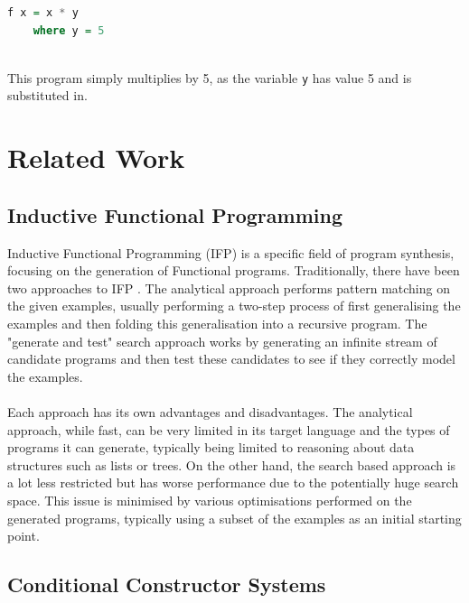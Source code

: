 \begin{lstlisting}[language = Haskell]
f x = x * y
	where y = 5
\end{lstlisting}
\mbox{}\\
This program simply multiplies by 5, as the variable \lstinline!y! has value 5 and is substituted in.

\section{Related Work}

\subsection{Inductive Functional Programming}

Inductive Functional Programming (IFP) \cite{IFPnotes} is a specific field of program synthesis, focusing on the generation of Functional programs. Traditionally, there have been two approaches to IFP \cite{Katayama2012}. The analytical approach performs pattern matching on the given examples, usually performing a two-step process of first generalising the examples and then folding this generalisation into a recursive program. The "generate and test" search approach works by generating an infinite stream of candidate programs and then test these candidates to see if they correctly model the examples. \\ \\
Each approach has its own advantages and disadvantages. The analytical approach, while fast, can be very limited in its target language and the types of programs it can generate, typically being limited to reasoning about data structures such as lists or trees. On the other hand, the search based approach is a lot less restricted but has worse performance due to the potentially huge search space. This issue is minimised by various optimisations performed on the generated programs, typically using a subset of the examples as an initial starting point.

\subsection{Conditional Constructor Systems}

